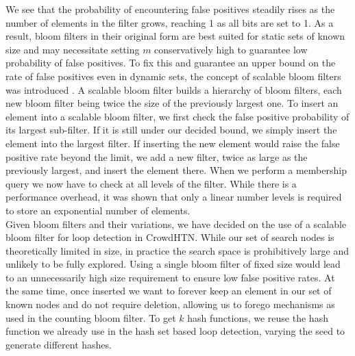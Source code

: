 We see that the probability of encountering false positives steadily rises as the number of elements in the filter grows, reaching 1 as all bits are set to 1. As a result, bloom filters in their original form are best suited for static sets of known size and may necessitate setting $m$ conservatively high to guarantee low probability of false positives. To fix this and guarantee an upper bound on the rate of false positives even in dynamic sets, the concept of scalable bloom filters was introduced \cite{xie2007scalable}. A scalable bloom filter builds a hierarchy of bloom filters, each new bloom filter being twice the size of the previously largest one. To insert an element into a scalable bloom filter, we first check the false positive probability of its largest sub-filter. If it is still under our decided bound, we simply insert the element into the largest filter. If inserting the new element would raise the false positive rate beyond the limit, we add a new filter, twice as large as the previously largest, and insert the element there. When we perform a membership query we now have to check at all levels of the filter. While there is a performance overhead, it was shown that only a linear number levels is required to store an exponential number of elements. \\
Given bloom filters and their variations, we have decided on the use of a scalable bloom filter for loop detection in CrowdHTN. While our set of search nodes is theoretically limited in size, in practice the search space is prohibitively large and unlikely to be fully explored. Using a single bloom filter of fixed size would lead to an unnecessarily high size requirement to ensure low false positive rates. At the same time, once inserted we want to forever keep an element in our set of known nodes and do not require deletion, allowing us to forego mechanisms as used in the counting bloom filter. To get $k$ hash functions, we reuse the hash function we already use in the hash set based loop detection, varying the seed to generate different hashes.
